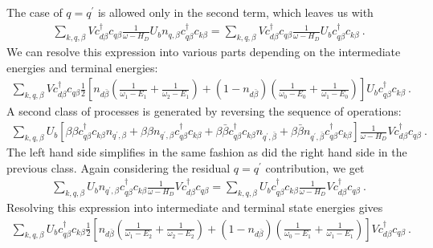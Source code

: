 The case of \(q=q^\prime\) is allowed only in the second term, which leaves us with
\begin{equation}\begin{aligned}
	\sum_{k,q,\beta}Vc^\dagger_{d\beta}c_{q\beta} \frac{1}{\omega - H_D} U_b n_{q,\beta}c^\dagger_{q\beta}c_{k\beta} = \sum_{k,q,\beta}Vc^\dagger_{d\beta}c_{q\beta} \frac{1}{\omega - H_D} U_b c^\dagger_{q\beta}c_{k\beta}~.
\end{aligned}\end{equation}
We can resolve this expression into various parts depending on the intermediate energies and terminal energies:
\begin{equation}\begin{aligned}\label{Vub1}
	\sum_{k,q,\beta}Vc^\dagger_{d\beta}c_{q\beta} \frac{1}{2}\left[n_{d\bar\beta}\left(\frac{1}{\omega_1 - E_1} + \frac{1}{\omega_2 - E_1}\right) + (1 - n_{d\bar\beta})\left(\frac{1}{\omega_0 - E_0} + \frac{1}{\omega_1 - E_0}\right)\right] U_b c^\dagger_{q\beta}c_{k\beta}~.
\end{aligned}\end{equation}
 A second class of processes is generated by reversing the sequence of operations:
 \begin{equation}\begin{aligned}
	\sum_{k,q,\beta}U_b \left[\beta\beta c^\dagger_{q\beta}c_{k\beta} n_{q^\prime,\beta} + \beta\beta n_{q^\prime,\beta}c^\dagger_{q\beta}c_{k\beta} + \beta\bar\beta c^\dagger_{q\beta}c_{k\beta} n_{q^\prime,\bar\beta} + \beta\bar\beta n_{q^\prime,\bar\beta}c^\dagger_{q\beta}c_{k\beta}\right] \frac{1}{\omega - H_D} Vc^\dagger_{d\beta}c_{q\beta}~.
 \end{aligned}\end{equation}
The left hand side simplifies in the same fashion as did the right hand side in the previous class. Again considering the residual \(q=q^\prime\) contribution, we get
\begin{equation}\begin{aligned}
	\sum_{k,q,\beta}U_b n_{q^\prime,\beta}c^\dagger_{q\beta}c_{k\beta} \frac{1}{\omega - H_D} Vc^\dagger_{d\beta}c_{q\beta} = \sum_{k,q,\beta}U_b c^\dagger_{q\beta}c_{k\beta} \frac{1}{\omega - H_D} Vc^\dagger_{d\beta}c_{q\beta}~.
\end{aligned}\end{equation}
Resolving this expression into intermediate and terminal state energies gives
\begin{equation}\begin{aligned}
	\sum_{k,q,\beta}U_b c^\dagger_{q\beta}c_{k\beta} \frac{1}{2}\left[n_{d\bar\beta}\left(\frac{1}{\omega_1 - E_2} + \frac{1}{\omega_2 - E_2}\right) + (1 - n_{d\bar\beta})\left(\frac{1}{\omega_0 - E_1} + \frac{1}{\omega_1 - E_1}\right)\right] Vc^\dagger_{d\beta}c_{q\beta}~.
\end{aligned}\end{equation}
